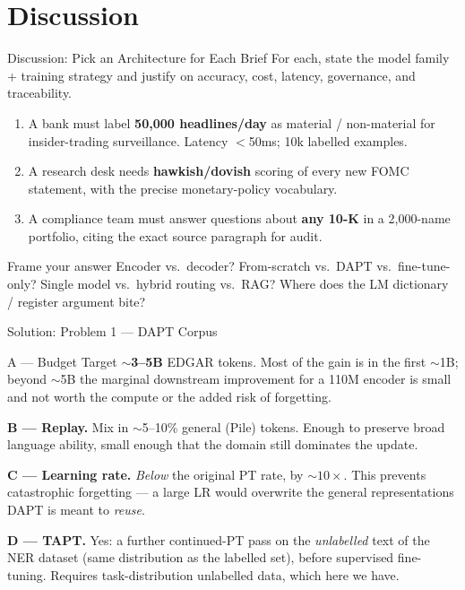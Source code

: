 \documentclass[9pt,t]{beamer}
\begin{document}
\section{Discussion}

\begin{frame}{Discussion: Pick an Architecture for Each Brief}
For each, state the model family + training strategy and justify on accuracy, cost,
latency, governance, and traceability.

\medskip
\begin{enumerate}
  \item A bank must label \textbf{50{,}000 headlines/day} as material / non-material
        for insider-trading surveillance. Latency $<$50ms; 10k labelled examples.
  \item A research desk needs \textbf{hawkish/dovish} scoring of every new FOMC
        statement, with the precise monetary-policy vocabulary.
  \item A compliance team must answer questions about \textbf{any 10-K} in a
        2{,}000-name portfolio, citing the exact source paragraph for audit.
\end{enumerate}

\medskip
\begin{block}{Frame your answer}
Encoder vs.\ decoder? From-scratch vs.\ DAPT vs.\ fine-tune-only? Single model vs.\
hybrid routing vs.\ RAG? Where does the LM dictionary / register argument bite?
\end{block}
\end{frame}


\begin{frame}{Solution: Problem 1 --- DAPT Corpus}
\begin{block}{A --- Budget}
Target $\sim$\textbf{3--5B} EDGAR tokens. Most of the gain is in the first $\sim$1B;
beyond $\sim$5B the marginal downstream improvement for a 110M encoder is small and
not worth the compute or the added risk of forgetting.
\end{block}
\textbf{B --- Replay.} Mix in $\sim$5--10\% general (Pile) tokens. Enough to preserve
broad language ability, small enough that the domain still dominates the update.

\medskip
\textbf{C --- Learning rate.} \emph{Below} the original PT rate, by $\sim 10\times$.
This prevents catastrophic forgetting --- a large LR would overwrite the general
representations DAPT is meant to \emph{reuse}.

\medskip
\textbf{D --- TAPT.} Yes: a further continued-PT pass on the \emph{unlabelled} text of
the NER dataset (same distribution as the labelled set), before supervised fine-tuning.
Requires task-distribution unlabelled data, which here we have.
\end{frame}
\end{document}
